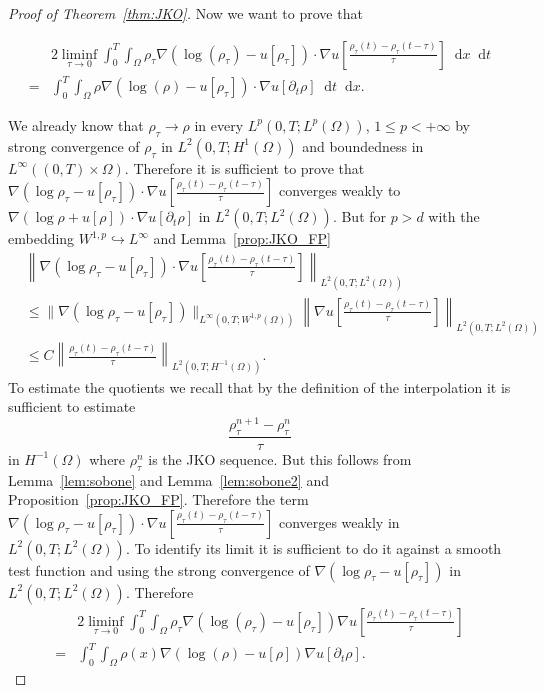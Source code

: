 \documentclass[a4paper,twosided, 11pt]{article}
\newcommand {\f}   {\frac}
\newcommand {\p}   {\partial}
\theoremstyle{plain}
\theoremstyle{remark}
\newcommand{\diff}{\mathop{}\!\mathrm{d}}
\numberwithin{equation}{section}
\begin{document}
\begin{proof}[Proof of Theorem~\ref{thm:JKO}]
Now we want to prove that 

\begin{align*}
&2\liminf_{\tau\to 0} \int_{0}^{T}\int_{\Omega}\rho_{\tau}\nabla\left(\log(\rho_{\tau})-u[\rho_{\tau}]\right)\cdot \nabla u\left[ \f{\rho_{\tau}(t)-\rho_{\tau}(t-\tau)}{\tau}\right]\diff x\diff t\\
=&\int_{0}^{T}\int_{\Omega}\rho\nabla(\log(\rho)-u[\rho_{\tau}])\cdot\nabla u[\p_t\rho]\diff t \diff x. 
\end{align*}

We already know that $\rho_{\tau}\to \rho$ in every $L^{p}(0,T; L^{p}(\Omega))$, $1\le p<+\infty$ by strong convergence of $\rho_{\tau}$ in $L^{2}(0,T; H^{1}(\Omega))$ and boundedness in $L^{\infty}((0,T)\times\Omega)$. Therefore it is sufficient to prove that $\nabla (\log\rho_{\tau} -u[\rho_{\tau}])\cdot\nabla u\left[ \f{\rho_{\tau}(t)-\rho_{\tau}(t-\tau)}{\tau}\right]$ converges weakly to $\nabla (\log \rho + u[\rho]) \cdot \nabla u[\p_{t}\rho] $ in $L^{2}(0,T; L^{2}(\Omega))$. 
But for $p>d$ with the embedding $W^{1,p}\hookrightarrow L^{\infty} $ and Lemma~\ref{prop:JKO_FP}
\begin{align*}
&\left\|\nabla (\log\rho_{\tau} -u[\rho_{\tau}])\cdot\nabla u\left[ \f{\rho_{\tau}(t)-\rho_{\tau}(t-\tau)}{\tau}\right]\right\|_{L^{2}(0,T; L^{2}(\Omega))} \\
&\le \|\nabla (\log\rho_{\tau} -u[\rho_{\tau}])\|_{L^{\infty}(0,T; W^{1,p}(\Omega))}
 \left\|\nabla u\left[\f{\rho_{\tau}(t)-\rho_{\tau}(t-\tau)}{\tau}\right]\right\|_{L^{2}(0,T; L^{2}(\Omega))}\\
 & \le C\left\|\f{\rho_{\tau}(t)-\rho_{\tau}(t-\tau)}{\tau}\right\|_{L^{2}(0,T; H^{-1}(\Omega))}.
\end{align*}
To estimate the quotients we recall that by the definition of the interpolation it is sufficient to estimate 
$$
\f{\rho^{n+1}_{\tau}-\rho^{n}_{\tau}}{\tau}
$$
in $H^{-1}(\Omega)$ where $\rho^{n}_{\tau}$ is the JKO sequence. But this follows from Lemma~\ref{lem:sobone} and Lemma~\ref{lem:sobone2} and Proposition~\ref{prop:JKO_FP}. Therefore the term $\nabla (\log\rho_{\tau} -u[\rho_{\tau}])\cdot \nabla u\left[\f{\rho_{\tau}(t)-\rho_{\tau}(t-\tau)}{\tau}\right]$ converges weakly in $L^{2}(0,T; L^{2}(\Omega))$. To identify its limit it is sufficient to do it against a smooth test function and using the strong convergence of $\nabla (\log \rho_\tau -u[\rho_{\tau}])$ in $L^{2}(0,T; L^{2}(\Omega))$. Therefore
\begin{align*}
&2\liminf_{\tau\to 0} \int_{0}^{T}\int_{\Omega}\rho_{\tau}\nabla(\log(\rho_{\tau})-u[\rho_{\tau}])\nabla u\left[\f{\rho_{\tau}(t)-\rho_{\tau}(t-\tau)}{\tau}\right]\\
=&\int_{0}^{T}\int_{\Omega}\rho(x)\nabla(\log(\rho)-u[\rho])\nabla u[\p_{t}\rho]. 
\end{align*}


\end{proof}
\end{document}
